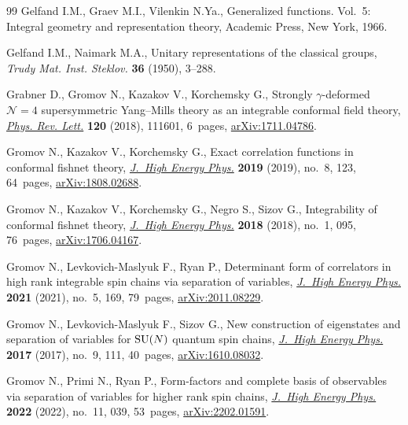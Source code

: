\begin{thebibliography}{99}
Gelfand I.M., Graev M.I., Vilenkin N.Ya., Generalized functions. {V}ol.~5:
 {I}ntegral geometry and representation theory, Academic Press, New York,
 1966.

Gelfand I.M., Naimark M.A., Unitary representations of the classical groups,
 \textit{Trudy Mat. Inst. Steklov.} \textbf{36} (1950), 3--288.

Grabner D., Gromov N., Kazakov V., Korchemsky G., Strongly {$\gamma$}-deformed
 {$\mathcal{N}=4$} supersymmetric {Y}ang--{M}ills theory as an integrable
 conformal field theory,
 \href{https://doi.org/10.1103/PhysRevLett.120.111601}{\textit{Phys. Rev.
 Lett.}} \textbf{120} (2018), 111601, 6~pages,
 \href{http://arxiv.org/abs/1711.04786}{arXiv:1711.04786}.

Gromov N., Kazakov V., Korchemsky G., Exact correlation functions in conformal
 fishnet theory,
 \href{https://doi.org/10.1007/jhep08(2019)123}{\textit{J.~High Energy Phys.}}
 \textbf{2019} (2019), no.~8, 123, 64~pages,
 \href{http://arxiv.org/abs/1808.02688}{arXiv:1808.02688}.

Gromov N., Kazakov V., Korchemsky G., Negro S., Sizov G., Integrability of
 conformal fishnet theory,
 \href{https://doi.org/10.1007/jhep01(2018)095}{\textit{J.~High Energy Phys.}}
 \textbf{2018} (2018), no.~1, 095, 76~pages,
 \href{http://arxiv.org/abs/1706.04167}{arXiv:1706.04167}.

Gromov N., Levkovich-Maslyuk F., Ryan P., Determinant form of correlators in
 high rank integrable spin chains via separation of variables,
 \href{https://doi.org/10.1007/jhep05(2021)169}{\textit{J.~High Energy Phys.}}
 \textbf{2021} (2021), no.~5, 169, 79~pages,
 \href{http://arxiv.org/abs/2011.08229}{arXiv:2011.08229}.

Gromov N., Levkovich-Maslyuk F., Sizov G., New construction of eigenstates and
 separation of variables for {${\rm SU}(N)$} quantum spin chains,
 \href{https://doi.org/10.1007/jhep09(2017)111}{\textit{J.~High Energy Phys.}}
 \textbf{2017} (2017), no.~9, 111, 40~pages,
 \href{http://arxiv.org/abs/1610.08032}{arXiv:1610.08032}.

Gromov N., Primi N., Ryan P., Form-factors and complete basis of observables
 via separation of variables for higher rank spin chains,
 \href{https://doi.org/10.1007/jhep11(2022)039}{\textit{J.~High Energy Phys.}}
 \textbf{2022} (2022), no.~11, 039, 53~pages,
 \href{http://arxiv.org/abs/2202.01591}{arXiv:2202.01591}.


\end{thebibliography}
